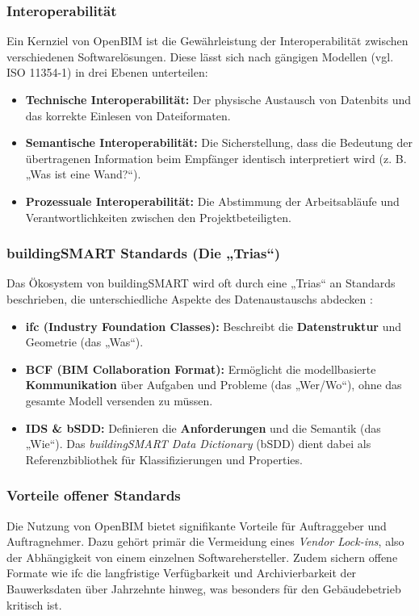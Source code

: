 \subsubsection{Interoperabilität}
Ein Kernziel von OpenBIM ist die Gewährleistung der Interoperabilität zwischen verschiedenen Softwarelösungen. Diese lässt sich nach gängigen Modellen (vgl. ISO 11354-1) in drei Ebenen unterteilen:
\begin{itemize}
    \item \textbf{Technische Interoperabilität:} Der physische Austausch von Datenbits und das korrekte Einlesen von Dateiformaten.
    \item \textbf{Semantische Interoperabilität:} Die Sicherstellung, dass die Bedeutung der übertragenen Information beim Empfänger identisch interpretiert wird (z. B. „Was ist eine Wand?“).
    \item \textbf{Prozessuale Interoperabilität:} Die Abstimmung der Arbeitsabläufe und Verantwortlichkeiten zwischen den Projektbeteiligten.
\end{itemize}


\subsubsection{buildingSMART Standards (Die „Trias“)}
Das Ökosystem von buildingSMART wird oft durch eine „Trias“ an Standards beschrieben, die unterschiedliche Aspekte des Datenaustauschs abdecken \cite{eichler2024bimcert, kladz2025ids}:

\begin{itemize}
    \item \textbf{\gls{ifc} (Industry Foundation Classes):} Beschreibt die \textbf{Datenstruktur} und Geometrie (das „Was“).
    \item \textbf{BCF (BIM Collaboration Format):} Ermöglicht die modellbasierte \textbf{Kommunikation} über Aufgaben und Probleme (das „Wer/Wo“), ohne das gesamte Modell versenden zu müssen.
    \item \textbf{IDS \& bSDD:} Definieren die \textbf{Anforderungen} und die Semantik (das „Wie“). Das \textit{buildingSMART Data Dictionary} (bSDD) dient dabei als Referenzbibliothek für Klassifizierungen und Properties.
\end{itemize}

\subsubsection{Vorteile offener Standards}
Die Nutzung von OpenBIM bietet signifikante Vorteile für Auftraggeber und Auftragnehmer. Dazu gehört primär die Vermeidung eines \textit{Vendor Lock-ins}, also der Abhängigkeit von einem einzelnen Softwarehersteller. Zudem sichern offene Formate wie \gls{ifc} die langfristige Verfügbarkeit und Archivierbarkeit der Bauwerksdaten über Jahrzehnte hinweg, was besonders für den Gebäudebetrieb kritisch ist.

